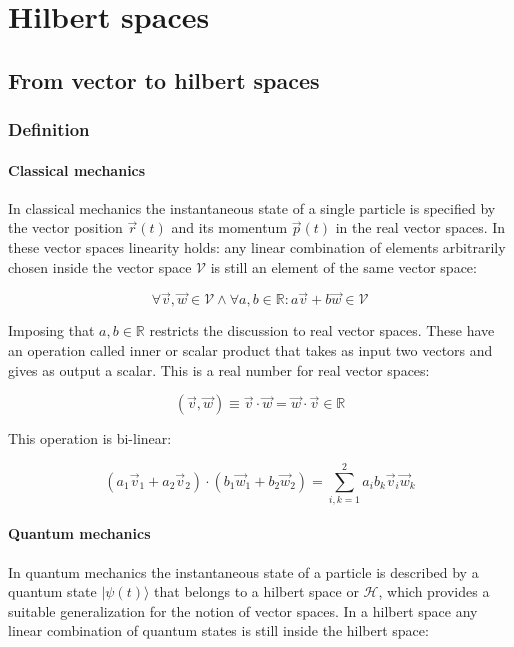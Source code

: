 \chapter{Hilbert spaces}

\section{From vector to hilbert spaces}

	\subsection{Definition}

		\subsubsection{Classical mechanics}
		In classical mechanics the instantaneous state of a single particle is specified by the vector position $\vec{r}(t)$ and its momentum $\vec{p}(t)$ in the real vector spaces.
		In these vector spaces linearity holds: any linear combination of elements arbitrarily chosen inside the vector space $\mathcal{V}$ is still an element of the same vector space:

		$$\forall \vec{v}, \vec{w}\in\mathcal{V}\land\forall a, b\in\mathbb{R}: a\vec{v}+b\vec{w}\in\mathcal{V}$$

		Imposing that $a,b\in\mathbb{R}$ restricts the discussion to real vector spaces.
		These have an operation called inner or scalar product that takes as input two vectors and gives as output a scalar.
		This is a real number for real vector spaces:

		$$(\vec{v}, \vec{w})\equiv \vec{v}\cdot\vec{w} = \vec{w}\cdot\vec{v}\in\mathbb{R}$$

		This operation is bi-linear:

		$$(a_1\vec{v}_1 + a_2\vec{v}_2)\cdot(b_1\vec{w}_1 + b_2\vec{w}_2) = \sum\limits_{i, k=1}^2 a_ib_k\vec{v}_i\vec{w}_k$$

		\subsubsection{Quantum mechanics}
		In quantum mechanics the instantaneous state of a particle is described by a quantum state $|\psi(t)\rangle$ that belongs to a hilbert space or $\mathcal{H}$, which provides a suitable generalization for the notion of vector spaces.
		In a hilbert space any linear combination of quantum states is still inside the hilbert space:

